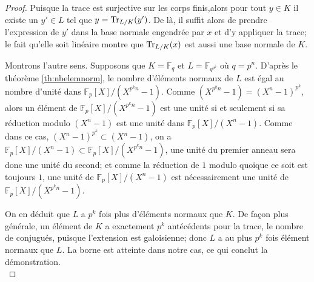 \documentclass[a4paper]{article} %
\numberwithin{section}{part}
\numberwithin{equation}{section}
\newcommand\GF[1]{\mathbb{F}_{#1}}
\begin{document}
\begin{proof}
Puisque la trace est surjective sur les corps finis,alors pour tout $y\in K$ il 
existe un $y'\in L$ tel que $y = \textup{Tr}_{L/K}(y')$. De là, il suffit alors 
de prendre l'expression de $y'$ dans la base normale engendrée par $x$ et d'y 
appliquer la trace; le fait qu'elle soit linéaire montre que 
$\textup{Tr}_{L/K}(x)$ est aussi une base normale de $K$.\par
Montrons l'autre sens. Supposons que $K = \GF{q}$ et $L = \GF{q^{p^k}}$ où $q
= p^n$. D'après le théorème \ref{th:nbelemnorm}, le nombre d'éléments normaux de
$L$ est égal au nombre d'unité dans $\GF{p}[X]/(X^{p^kn} - 1)$. Comme
$(X^{p^kn} - 1 ) = (X^n - 1)^{p^k}$, alors un élément de $\GF{p}[X]/(X^{p^kn} - 
1)$ est une unité si et seulement si sa réduction modulo $(X^n - 1)$ est une
unité dans $\GF{p}[X]/(X^n - 1)$.
Comme dans ce cas, $(X^n - 1)^{p^k} \subset (X^n - 1)$, on a $\GF{p}[X]/
(X^n - 1) \subset \GF{p}[X]/(X^{p^kn} - 1)$, une unité du premier anneau sera 
donc une unité du second; et comme la réduction de $1$ modulo quoique ce soit 
est toujours $1$, une unité de $\GF{p}[X]/(X^n - 1)$ est nécessairement une 
unité de $\GF{p}[X]/(X^{p^kn} - 1)$.\par
On en déduit que $L$ a $p^k$ fois plus d'éléments normaux que $K$. De façon plus
générale, un élément de $K$ a exactement $p^k$ antécédents pour la trace, le
nombre de conjugués, puisque l'extension est galoisienne; donc $L$ a au plus
$p^k$ fois élément normaux que $L$. La borne est atteinte dans notre cas, ce qui
conclut la démonstration.\\
\end{proof}
\end{document}
